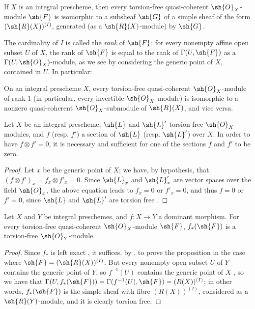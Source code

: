 \begin{proposition}[7.4.2]
\label{I.7.4.2}
If $X$ is an integral prescheme, then every torsion-free quasi-coherent $\sh{O}_X$-module $\sh{F}$ is isomorphic to a subsheaf $\sh{G}$ of a simple sheaf of the form $(\sh{R}(X))^{(I)}$, generated (as a $\sh{R}(X)$-module) by $\sh{G}$.
\end{proposition}

The cardinality of $I$ is called the \emph{rank} of $\sh{F}$; for every nonempty affine open subset $U$ of $X$, the rank of $\sh{F}$ is equal to the rank of $\Gamma(U,\sh{F})$ as a $\Gamma(U,\sh{O}_X)$-module, as we see by considering the generic point of $X$, contained in $U$.
In particular:
\begin{corollary}[7.4.3]
\label{I.7.4.3}
On an integral prescheme $X$, every torsion-free quasi-coherent $\sh{O}_X$-module of rank $1$ (in particular, every invertible $\sh{O}_X$-module) is isomorphic to a nonzero quasi-coherent $\sh{O}_X$-submodule of $\sh{R}(X)$, and vice versa.
\end{corollary}

\begin{corollary}[7.4.4]
\label{I.7.4.4}
Let $X$ be an integral prescheme, $\sh{L}$ and $\sh{L}'$ torsion-free $\sh{O}_X$-modules, and $f$ (resp. $f'$) a section of $\sh{L}$ (resp. $\sh{L}'$) over $X$.
In order to have $f\otimes f'=0$, it is necessary and sufficient for one of the sections $f$ and $f'$ to be zero.
\end{corollary}

\begin{proof}
Let $x$ be the generic point of $X$; we have, by hypothesis, that $(f\otimes f')_x=f_x\otimes f'_x=0$.
Since $\sh{L}_x$ and $\sh{L}'_x$ are vector spaces over the field $\sh{O}_x$, the above equation leads to $f_x=0$ or $f'_x=0$, and thus $f=0$ or $f'=0$, since $\sh{L}$ and $\sh{L}'$ are torsion free .
\end{proof}

\begin{proposition}[7.4.5]
\label{I.7.4.5}
Let $X$ and $Y$ be integral preschemes, and $f:X\to Y$ a dominant morphism.
For every torsion-free quasi-coherent $\sh{O}_X$-module $\sh{F}$, $f_*(\sh{F})$ is a torsion-free $\sh{O}_Y$-module.
\end{proposition}

\begin{proof}
Since
$f_*$ is left exact , it suffices, by , to prove the proposition in the case where $\sh{F}=(\sh{R}(X))^{(I)}$.
But every nonempty open subset $U$ of $Y$ contains the generic point of $Y$, so $f^{-1}(U)$ contains the generic point of $X$ , so we have that $\Gamma(U,f_*(\sh{F}))=\Gamma(f^{-1}(U),\sh{F})=(R(X))^{(I)}$; in other words, $f_*(\sh{F})$ is the simple sheaf with fibre $(R(X))^{(I)}$, considered as a $\sh{R}(Y)$-module, and it is clearly torsion free.
\end{proof}

